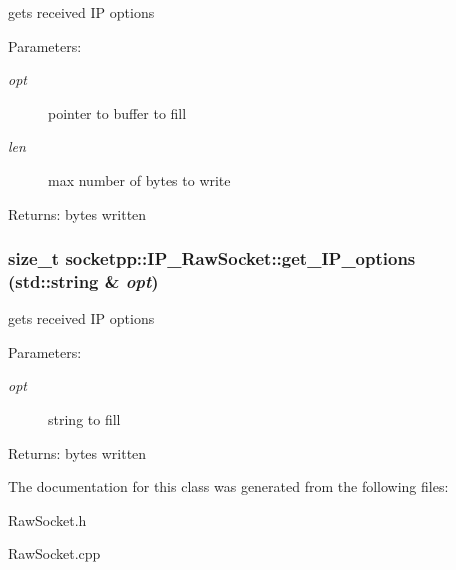 gets received IP options 

\begin{Desc}
\item[Parameters:]
\begin{description}
\item[{\em opt}]pointer to buffer to fill \item[{\em len}]max number of bytes to write \end{description}
\end{Desc}
\begin{Desc}
\item[Returns:]bytes written \end{Desc}
\hypertarget{classsocketpp_1_1IP__RawSocket_c9bec0c1db60871bb1cb5560b97e02ed}{
\subsubsection{\setlength{\rightskip}{0pt plus 5cm}size\_\-t socketpp::IP\_\-RawSocket::get\_\-IP\_\-options (std::string \& {\em opt})}}
\label{classsocketpp_1_1IP__RawSocket_c9bec0c1db60871bb1cb5560b97e02ed}


gets received IP options 

\begin{Desc}
\item[Parameters:]
\begin{description}
\item[{\em opt}]string to fill \end{description}
\end{Desc}
\begin{Desc}
\item[Returns:]bytes written \end{Desc}


The documentation for this class was generated from the following files:\begin{CompactItemize}
\item 
RawSocket.h\item 
RawSocket.cpp\end{CompactItemize}
